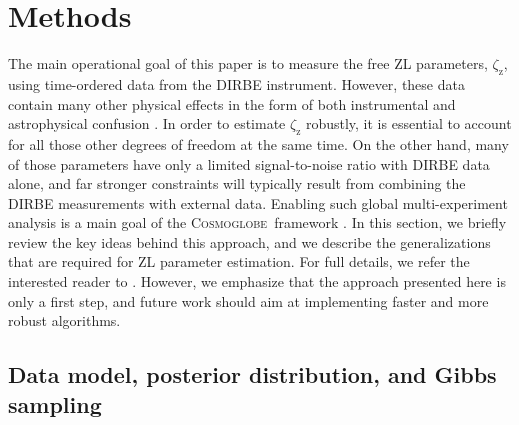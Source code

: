 \documentclass[twocolumn]{aa}
\newcommand{\cosmoglobe}{\textsc{Cosmoglobe}}
\begin{document}
\section{Methods}\label{sect:param-estimation}

The main operational goal of this paper is to measure the free ZL
parameters, $\zeta_{\mathrm{z}}$, using time-ordered data from the
DIRBE instrument. However, these data contain many other physical
effects in the form of both instrumental and astrophysical confusion
\citep[e.g.,][]{hauser1998,arendt1998}. In order to estimate
$\zeta_{\mathrm{z}}$ robustly, it is essential to account for all
those other degrees of freedom at the same time. On the other hand,
many of those parameters have only a limited signal-to-noise ratio
with DIRBE data alone, and far stronger constraints will typically
result from combining the DIRBE measurements with external
data. Enabling such global multi-experiment analysis is a main goal of
the \cosmoglobe\ framework \citep{bp05}. In this section, we briefly review the key
ideas behind this approach, and we describe the generalizations that
are required for ZL parameter estimation. For full details, we refer
the interested reader to \citet{Watts2023,CG02_01}. However, we
emphasize that the approach presented here is only a first step, and
future work should aim at implementing faster and more robust
algorithms.


\subsection{Data model, posterior distribution, and Gibbs sampling}
\label{sec:gibbs}
\end{document}
